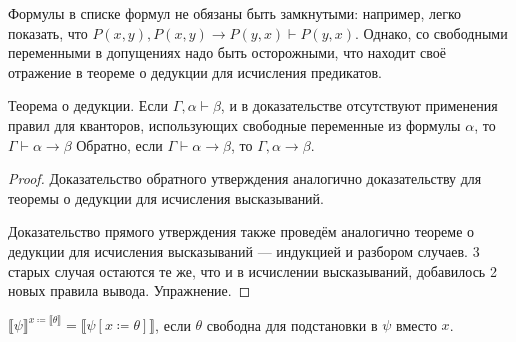 Формулы в списке формул не обязаны быть замкнутыми: например, легко 
показать, что $P(x,y), P(x,y)\rightarrow P(y,x) \vdash P(y,x)$. Однако,
со свободными переменными в допущениях надо быть осторожными, что 
находит своё отражение в теореме о дедукции для исчисления предикатов.

\begin{theorem}
Теорема о дедукции. Если $\Gamma, \alpha \vdash \beta$, 
и в доказательстве отсутствуют применения правил для кванторов, использующих
свободные переменные из формулы $\alpha$, то $\Gamma \vdash \alpha \rightarrow \beta$
Обратно, если $\Gamma \vdash \alpha\rightarrow\beta$, то $\Gamma,\alpha\rightarrow\beta$.
\end{theorem}

\begin{proof}
Доказательство обратного утверждения аналогично доказательству для теоремы о дедукции
для исчисления высказываний.

Доказательство прямого утверждения также проведём аналогично теореме о дедукции 
для исчисления высказываний --- индукцией и разбором случаев. 
3 старых случая остаются те же, что и в исчислении высказываний, 
добавилось 2 новых правила вывода. Упражнение.
\end{proof}

\begin{lemma}\label{free_substitution}
$\llbracket \psi \rrbracket^{x \coloneqq  \llbracket\theta\rrbracket} = \llbracket \psi[x \coloneqq  \theta] \rrbracket$,
если $\theta$ свободна для подстановки в $\psi$ вместо $x$.
\end{lemma}


